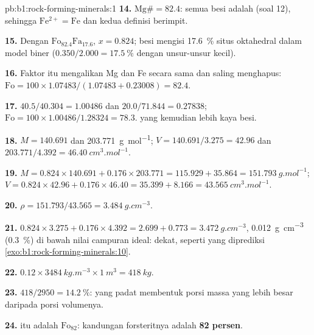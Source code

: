 \begin{solution}{pb:b1:rock-forming-minerals:1}
\textbf{14.} $\mathrm{Mg\#} = 82.4$: semua besi adalah 
(soal 12), sehingga $\mathrm{Fe^{2+}} = \mathrm{Fe}$ dan kedua definisi berimpit.

\textbf{15.} Dengan $\text{Fo}_{82.4}\text{Fa}_{17.6}$, $x = 0.824$; besi mengisi
\qty{17.6}{\percent} situs oktahedral dalam model biner
($0.350/2.000 = \qty{17.5}{\percent}$ dengan unsur-unsur kecil).

\textbf{16.} Faktor itu mengalikan Mg dan Fe secara sama dan saling menghapus:
$\mathrm{Fo} = 100\times1.07483/(1.07483 + 0.23008) = 82.4$.

\textbf{17.} $40.5/40.304 = 1.00486$ dan $20.0/71.844 = 0.27838$;
$\mathrm{Fo} = 100\times1.00486/1.28324 = 78.3$.  yang kemudian lebih kaya
besi.

\textbf{18.} $M = 140.691$ dan \qty{203.771}{g.mol^{-1}};
$V = 140.691/3.275 = 42.96$ dan $203.771/4.392 =
\qty{46.40}{cm^3.mol^{-1}}$.

\textbf{19.} $M = 0.824\times140.691 + 0.176\times203.771 = 115.929 +
35.864 = \qty{151.793}{g.mol^{-1}}$; $V = 0.824\times42.96 +
0.176\times46.40 = 35.399 + 8.166 = \qty{43.565}{cm^3.mol^{-1}}$.

\textbf{20.} $\rho = 151.793/43.565 = \qty{3.484}{g.cm^{-3}}$.

\textbf{21.} $0.824\times3.275 + 0.176\times4.392 = 2.699 + 0.773 =
\qty{3.472}{g.cm^{-3}}$, \qty{0.012}{g.cm^{-3}} (\qty{0.3}{\percent}) di bawah
nilai campuran ideal: dekat, seperti yang diprediksi
\cref{exo:b1:rock-forming-minerals:10}.

\textbf{22.} $0.12\times\qty{3484}{kg.m^{-3}}\times\qty{1}{m^3} =
\qty{418}{kg}$.

\textbf{23.} $418/2950 = \qty{14.2}{\percent}$:  yang padat membentuk porsi massa yang lebih besar daripada porsi volumenya.

\textbf{24.}  itu adalah $\text{Fo}_{82}$: kandungan forsteritnya adalah
\textbf{82 persen}.
\end{solution}
